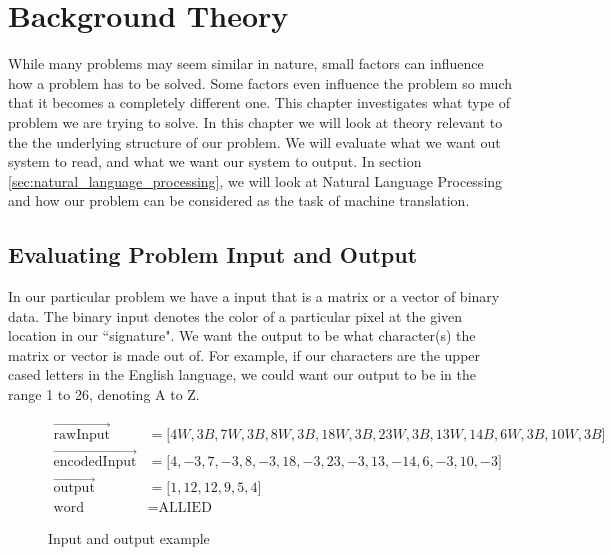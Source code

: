 
\chapter{Background Theory}
\label{ch:background}
While many problems may seem similar in nature, small factors can influence how a problem has to be solved. Some factors even influence the problem so much that it becomes a completely different one. This chapter investigates what type of problem we are trying to solve. In this chapter we will look at theory relevant to the the underlying structure of our problem. We will evaluate what we want out system to read, and what we want our system to output. In section \ref{sec:natural_language_processing}, we will look at Natural Language Processing and how our problem can be considered as the task of machine translation.


\section{Evaluating Problem Input and Output}
In our particular problem we have a input that is a matrix or a vector of binary data. The binary input denotes the color of a particular pixel at the given location in our ``signature". We want the output to be what character(s) the matrix or vector is made out of. For example, if our characters are the upper cased letters in the English language, we could want our output to be in the range 1 to 26, denoting A to Z. 

\begin{figure}[h]
    \begin{equation}
        \label{eq:input_output_example}
        \begin{aligned}
           \vec{\text{rawInput}}        &= \lbrack 4W, 3B, 7W, 3B, 8W, 3B, 18W, 3B, 23W, 3B, 13W, 14B, 6W, 3B, 10W, 3B \rbrack \\
           \vec{\text{encodedInput}}    &= \lbrack 4, -3, 7, -3, 8, -3, 18, -3, 23, -3, 13, -14, 6, -3, 10, -3 \rbrack \\
           \vec{\text{output}}          &= \lbrack 1, 12, 12, 9, 5, 4 \rbrack \\
           \text{word}                  &= \text{ALLIED}
        \end{aligned}
    \end{equation}
    \captionsetup{labelformat=empty}
    \caption{Input and output example}
\end{figure}

